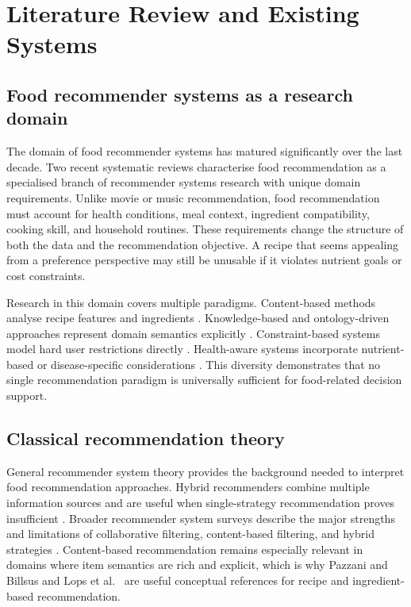 %
%
\chapter{Literature Review and Existing Systems}
\label{chap:01}
\setlength{\parskip}{1em}

\section{Food recommender systems as a research domain}

The domain of food recommender systems has matured significantly over the last decade. Two recent systematic reviews \cite{bondevik2024,mahajan2024} characterise food recommendation as a specialised branch of recommender systems research with unique domain requirements. Unlike movie or music recommendation, food recommendation must account for health conditions, meal context, ingredient compatibility, cooking skill, and household routines. These requirements change the structure of both the data and the recommendation objective. A recipe that seems appealing from a preference perspective may still be unusable if it violates nutrient goals or cost constraints.

Research in this domain covers multiple paradigms. Content-based methods analyse recipe features and ingredients \cite{freyne2010a,teng2012}. Knowledge-based and ontology-driven approaches represent domain semantics explicitly \cite{al_nazer2014,bianchini2015,maneerat2013}. Constraint-based systems model hard user restrictions directly \cite{felfernig2008,pawar2016}. Health-aware systems incorporate nutrient-based or disease-specific considerations \cite{jung2016,yera2023}. This diversity demonstrates that no single recommendation paradigm is universally sufficient for food-related decision support.

\section{Classical recommendation theory}

General recommender system theory provides the background needed to interpret food recommendation approaches. Hybrid recommenders combine multiple information sources and are useful when single-strategy recommendation proves insufficient \cite{burke2002}. Broader recommender system surveys describe the major strengths and limitations of collaborative filtering, content-based filtering, and hybrid strategies \cite{bobadilla2013,adomavicius2005}. Content-based recommendation remains especially relevant in domains where item semantics are rich and explicit, which is why Pazzani and Billsus \cite{pazzani2007} and Lops et al.\ \cite{lops2011} are useful conceptual references for recipe and ingredient-based recommendation.

